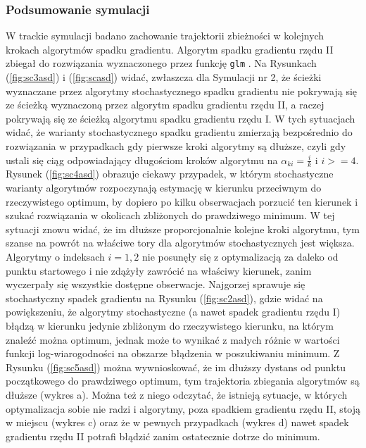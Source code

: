 \subsubsection{Podsumowanie symulacji}
W trackie symulacji badano zachowanie trajektorii zbieżności w kolejnych krokach algorytmów spadku gradientu. Algorytm spadku gradientu rzędu II zbiegał do rozwiązania wyznaczonego przez funkcję \texttt{glm} \cite{glmglm}. Na Rysunkach (\ref{fig:sc3asd}) i (\ref{fig:scasd}) widać, zwłaszcza dla Symulacji nr 2, że ścieżki wyznaczane przez algorytmy stochastycznego spadku gradientu nie pokrywają się ze ścieżką wyznaczoną przez algorytm spadku gradientu rzędu II, a raczej pokrywają się ze ścieżką algorytmu spadku gradientu rzędu I. W tych sytuacjach widać, że warianty stochastycznego spadku gradientu zmierzają bezpośrednio do rozwiązania w przypadkach gdy pierwsze kroki algorytmy są dłuższe, czyli gdy ustali się ciąg odpowiadający długościom kroków algorytmu na $\alpha_{ki} = \frac{i}{k}$ i $i>=4$.
Rysunek (\ref{fig:sc4asd}) obrazuje ciekawy przypadek, w którym stochastyczne warianty algorytmów rozpoczynają estymację w kierunku przeciwnym do rzeczywistego optimum, by dopiero po kilku obserwacjach porzucić ten kierunek i szukać rozwiązania w okolicach zbliżonych do prawdziwego minimum. W tej sytuacji znowu widać, że im dłuższe proporcjonalnie kolejne kroki algorytmu, tym szanse na powrót na właściwe tory dla algorytmów stochastycznych jest większa. Algorytmy o indeksach $i = 1, 2$ nie posunęły się z optymalizacją za daleko od punktu startowego i nie zdążyły zawrócić na właściwy kierunek, zanim wyczerpały się wszystkie dostępne obserwacje. Najgorzej sprawuje się stochastyczny spadek gradientu na Rysunku (\ref{fig:sc2asd}), gdzie widać na powiększeniu, że algorytmy stochastyczne (a nawet spadek gradientu rzędu I) błądzą w kierunku jedynie zbliżonym do rzeczywistego kierunku, na którym znaleźć można optimum, jednak może to wynikać z małych różnic w wartości funkcji log-wiarogodności na obszarze błądzenia w poszukiwaniu minimum. Z Rysunku (\ref{fig:sc5asd}) można wywnioskować, że im dłuższy dystans od punktu początkowego do prawdziwego optimum, tym trajektoria zbiegania algorytmów są dłuższe (wykres a). Można też z niego odczytać, że istnieją sytuacje, w których optymalizacja sobie nie radzi i algorytmy, poza spadkiem gradientu rzędu II, stoją w miejscu (wykres c) oraz że w pewnych przypadkach (wykres d) nawet spadek gradientu rzędu II potrafi błądzić zanim ostatecznie dotrze do minimum.
